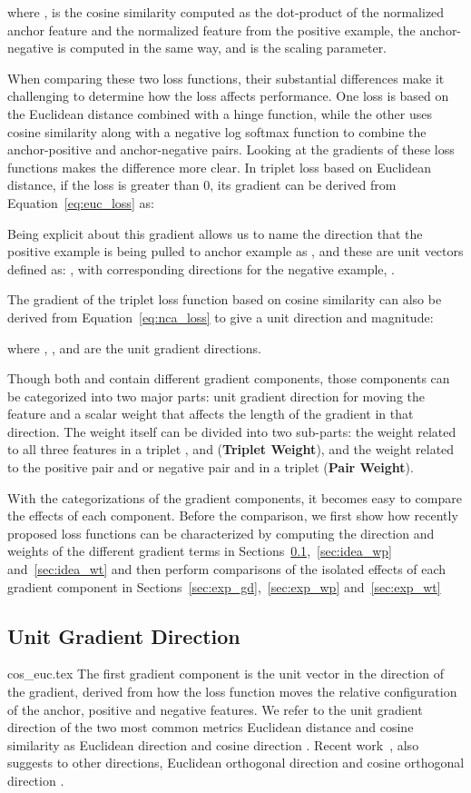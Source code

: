 \documentclass[10pt,twocolumn,letterpaper]{article}
\begin{document}
where , is the cosine similarity computed as the dot-product of the normalized anchor feature and the normalized feature from the positive example, the anchor-negative is computed in the same way,  and  is the scaling parameter.

When comparing these two loss functions, their substantial differences make it challenging to determine how the loss affects performance. One loss is based on the Euclidean distance combined with a hinge function, while the other uses cosine similarity along with a negative log softmax function to combine the anchor-positive and anchor-negative pairs.  Looking at the gradients of these loss functions makes the difference more clear.  In triplet loss based on Euclidean distance, if the loss is greater than 0, its gradient can be derived from Equation~\ref{eq:euc_loss} as:

Being explicit about this gradient allows us to name the direction that the positive example is being pulled to anchor example as , and these are unit vectors defined as: , with corresponding directions for the negative example, . 

The gradient of the triplet loss function based on cosine similarity can also be derived from Equation~\ref{eq:nca_loss} to give a unit direction and magnitude:

where , ,  and   are the unit gradient directions.

Though both  and  contain different gradient components, those components can be categorized into two major parts: unit gradient direction for moving the feature and a scalar weight that affects the length of the gradient in that direction.  The weight itself can be divided into two sub-parts: the weight related to all three features in a triplet ,  and  (\textbf{Triplet Weight}), and the weight related to the positive pair  and  or negative pair  and  in a triplet (\textbf{Pair Weight}).

With the categorizations of the gradient components, it becomes easy to compare the effects of each component. Before the comparison, we first show how recently proposed loss functions can be characterized by computing the direction and weights of the different gradient terms 
in Sections~\ref{sec:idea_gd},~\ref{sec:idea_wp} and~\ref{sec:idea_wt} and then perform comparisons of the isolated effects of each gradient component in Sections~\ref{sec:exp_gd},~\ref{sec:exp_wp} and~\ref{sec:exp_wt}

\subsection{Unit Gradient Direction}
\label{sec:idea_gd}
{cos_euc.tex}
The first gradient component is the unit vector in the direction of the gradient, derived from how the loss function moves the relative configuration of the anchor, positive and negative features.  We refer to the unit gradient direction of the two most common metrics Euclidean distance and cosine similarity as Euclidean direction  and cosine direction .   Recent work~\cite{Mohan_2020_CVPR}, also suggests to other directions, Euclidean orthogonal direction  and cosine orthogonal direction .
\end{document}

